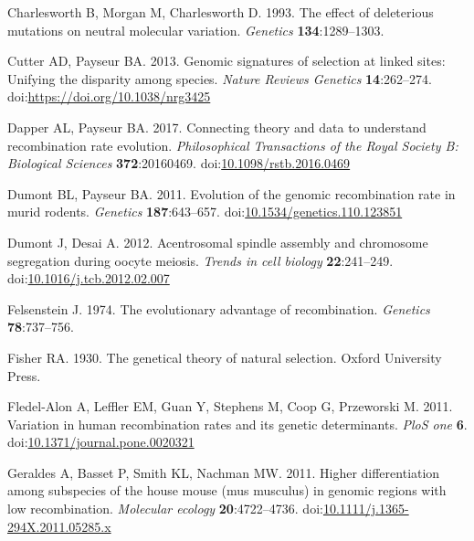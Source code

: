 \documentclass[
]{article}
\begin{document}
\leavevmode\hypertarget{ref-charlesworth1993}{}%
Charlesworth B, Morgan M, Charlesworth D. 1993. The effect of
deleterious mutations on neutral molecular variation. \emph{Genetics}
\textbf{134}:1289--1303.

\leavevmode\hypertarget{ref-cutter2013}{}%
Cutter AD, Payseur BA. 2013. Genomic signatures of selection at linked
sites: Unifying the disparity among species. \emph{Nature Reviews
Genetics} \textbf{14}:262--274.
doi:\href{https://doi.org/https://doi.org/10.1038/nrg3425}{https://doi.org/10.1038/nrg3425}

\leavevmode\hypertarget{ref-DapperPayseur2017}{}%
Dapper AL, Payseur BA. 2017. Connecting theory and data to understand
recombination rate evolution. \emph{Philosophical Transactions of the
Royal Society B: Biological Sciences} \textbf{372}:20160469.
doi:\href{https://doi.org/10.1098/rstb.2016.0469}{10.1098/rstb.2016.0469}

\leavevmode\hypertarget{ref-dumont2011murid}{}%
Dumont BL, Payseur BA. 2011. Evolution of the genomic recombination rate
in murid rodents. \emph{Genetics} \textbf{187}:643--657.
doi:\href{https://doi.org/10.1534/genetics.110.123851}{10.1534/genetics.110.123851}

\leavevmode\hypertarget{ref-dumontDesai2012}{}%
Dumont J, Desai A. 2012. Acentrosomal spindle assembly and chromosome
segregation during oocyte meiosis. \emph{Trends in cell biology}
\textbf{22}:241--249.
doi:\href{https://doi.org/10.1016/j.tcb.2012.02.007}{10.1016/j.tcb.2012.02.007}

\leavevmode\hypertarget{ref-felsenstein1974}{}%
Felsenstein J. 1974. The evolutionary advantage of recombination.
\emph{Genetics} \textbf{78}:737--756.

\leavevmode\hypertarget{ref-fisher1930}{}%
Fisher RA. 1930. The genetical theory of natural selection. Oxford
University Press.

\leavevmode\hypertarget{ref-fledel2011}{}%
Fledel-Alon A, Leffler EM, Guan Y, Stephens M, Coop G, Przeworski M.
2011. Variation in human recombination rates and its genetic
determinants. \emph{PloS one} \textbf{6}.
doi:\href{https://doi.org/10.1371/journal.pone.0020321}{10.1371/journal.pone.0020321}

\leavevmode\hypertarget{ref-geraldes2011}{}%
Geraldes A, Basset P, Smith KL, Nachman MW. 2011. Higher differentiation
among subspecies of the house mouse (mus musculus) in genomic regions
with low recombination. \emph{Molecular ecology} \textbf{20}:4722--4736.
doi:\href{https://doi.org/10.1111/j.1365-294X.2011.05285.x}{10.1111/j.1365-294X.2011.05285.x}
\end{document}
